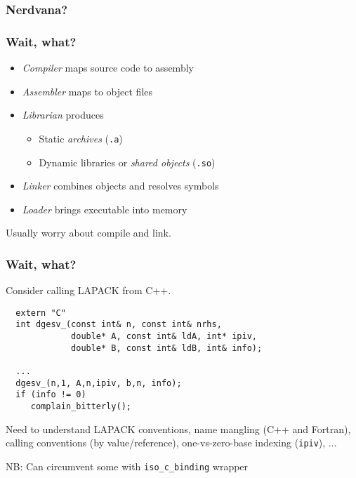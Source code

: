 \documentclass{beamer}
\begin{document}
\begin{frame}
  \frametitle{Nerdvana?}

  \begin{center}
  \end{center}
\end{frame}


\begin{frame}
  \frametitle{Wait, what?}

  \begin{itemize}
  \item {\em Compiler} maps source code to assembly
  \item {\em Assembler} maps to object files
  \item {\em Librarian} produces
    \begin{itemize}
    \item Static {\em archives} ({\tt .a})
    \item Dynamic libraries or {\em shared objects} ({\tt .so})
    \end{itemize}
  \item {\em Linker} combines objects and resolves symbols
  \item {\em Loader} brings executable into memory
  \end{itemize}
  Usually worry about compile and link.
\end{frame}


\begin{frame}[fragile]
  \frametitle{Wait, what?}

  Consider calling LAPACK from C++.
\begin{lstlisting}
  extern "C"
  int dgesv_(const int& n, const int& nrhs,
             double* A, const int& ldA, int* ipiv,
             double* B, const int& ldB, int& info);

  ...
  dgesv_(n,1, A,n,ipiv, b,n, info);
  if (info != 0)
     complain_bitterly();
\end{lstlisting}
  Need to understand LAPACK conventions,
  name mangling (C++ and Fortran),
  calling conventions (by value/reference),
  one-vs-zero-base indexing ({\tt ipiv}), ...

  \vspace{2mm}
  NB: Can circumvent some with {\tt iso\_c\_binding} wrapper
\end{frame}
\end{document}
